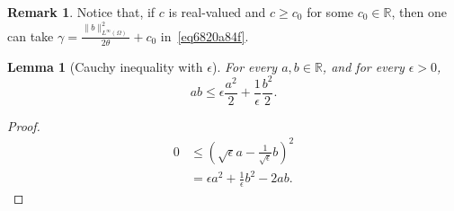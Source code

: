 \documentclass[a4paper,9pt]{amsart}
\newcommand{\R}{\mathbb{R}}	%
\theoremstyle{plain}
\newtheorem{lemma}[proposition]{Lemma}
\theoremstyle{definition}
\newtheorem{remark}[proposition]{Remark}
\theoremstyle{remark}
\begin{document}
\begin{remark}
	Notice that, if $c$ is real-valued and $c\ge c_0$ for some $c_0\in\R$, then one can take $\gamma= \frac{\|b\|_{L^\infty(\Omega)}^2}{2\theta} + c_0$ in~\eqref{eq6820a84f}. 
\end{remark}

\begin{lemma}[Cauchy inequality with $\epsilon$]
	For every $a,b\in\R$, and for every $\epsilon>0$,
	\begin{equation}\label{Cauchy}
		ab \le \epsilon \frac{a^2}{2} + \frac1\epsilon \frac{b^2}{2} .
	\end{equation}
\end{lemma}
\begin{proof}
	\begin{align}
		0
		&\le \left( \sqrt{\epsilon} a - \frac1{\sqrt{\epsilon}} b\right)^2 \\
		&= \epsilon a^2 + \frac1\epsilon b^2 - 2 ab .
	\end{align}
\end{proof}
\end{document}
